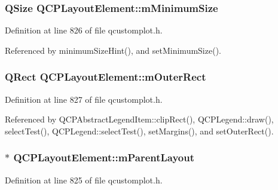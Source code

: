 \subsubsection[{m\+Minimum\+Size}]{\setlength{\rightskip}{0pt plus 5cm}Q\+Size Q\+C\+P\+Layout\+Element\+::m\+Minimum\+Size\hspace{0.3cm}{\ttfamily [protected]}}\label{class_q_c_p_layout_element_affef747c81632de33f08483b7fd10d01}


Definition at line 826 of file qcustomplot.\+h.



Referenced by minimum\+Size\+Hint(), and set\+Minimum\+Size().

\hypertarget{class_q_c_p_layout_element_a07bb4973379e75cb0fa5b032c1d24afd}{}
\subsubsection[{m\+Outer\+Rect}]{\setlength{\rightskip}{0pt plus 5cm}Q\+Rect Q\+C\+P\+Layout\+Element\+::m\+Outer\+Rect\hspace{0.3cm}{\ttfamily [protected]}}\label{class_q_c_p_layout_element_a07bb4973379e75cb0fa5b032c1d24afd}


Definition at line 827 of file qcustomplot.\+h.



Referenced by Q\+C\+P\+Abstract\+Legend\+Item\+::clip\+Rect(), Q\+C\+P\+Legend\+::draw(), select\+Test(), Q\+C\+P\+Legend\+::select\+Test(), set\+Margins(), and set\+Outer\+Rect().

\hypertarget{class_q_c_p_layout_element_ae7c75c25549608bd688bdb65d4c38066}{}
\subsubsection[{m\+Parent\+Layout}]{$\ast$ Q\+C\+P\+Layout\+Element\+::m\+Parent\+Layout\hspace{0.3cm}{\ttfamily [protected]}}\label{class_q_c_p_layout_element_ae7c75c25549608bd688bdb65d4c38066}


Definition at line 825 of file qcustomplot.\+h.



